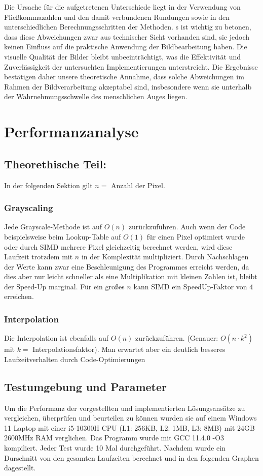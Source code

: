\documentclass[course=erap]{aspdoc}
\begin{document}
Die Ursache für die aufgetretenen Unterschiede liegt in der Verwendung von Fließkommazahlen und den damit verbundenen Rundungen sowie in den unterschiedlichen Berechnungsschritten der Methoden. s ist wichtig zu betonen, dass diese Abweichungen zwar aus technischer Sicht vorhanden sind, sie jedoch keinen Einfluss auf die praktische Anwendung der Bildbearbeitung haben. Die visuelle Qualität der Bilder bleibt unbeeinträchtigt, was die Effektivität und Zuverlässigkeit der untersuchten Implementierungen unterstreicht. Die Ergebnisse bestätigen daher unsere theoretische Annahme, dass solche Abweichungen im Rahmen der Bildverarbeitung akzeptabel sind, insbesondere wenn sie unterhalb der Wahrnehmungsschwelle des menschlichen Auges liegen.

\section{Performanzanalyse}
\subsection{Theorethische Teil:}
In der folgenden Sektion gilt $n =$ Anzahl der Pixel.

\subsubsection{Grayscaling}
Jede Grayscale-Methode ist auf $O(n)$ zurückzuführen. Auch wenn der Code beispielsweise beim Lookup-Table auf $O(1)$ für einen Pixel optimiert wurde oder durch SIMD mehrere Pixel gleichzeitig berechnet werden, wird diese Laufzeit trotzdem mit $n$ in der Komplexität multipliziert. Durch Nachschlagen der Werte kann zwar eine Beschleunigung des Programmes erreicht werden, da dies aber nur leicht schneller als eine Multiplikation mit kleinen Zahlen ist, bleibt der Speed-Up marginal. Für ein großes $n$ kann SIMD ein SpeedUp-Faktor von $4$ erreichen.

\subsubsection{Interpolation}
Die Interpolation ist ebenfalls auf $O(n)$ zurückzuführen. (Genauer: $O(n \cdot k^{2})$ mit $k =$ Interpolationsfaktor). Man erwartet aber ein deutlich besseres Laufzeitverhalten durch Code-Optimierungen

\subsection{Testumgebung und Parameter}
Um die Performanz der vorgestellten und implementierten Lösungsansätze zu vergleichen, überprüfen und beurteilen zu können wurden sie auf einem Windows 11 Laptop mit einer i5-10300H CPU (L1: 256KB, L2: 1MB, L3: 8MB) mit 24GB 2600MHz RAM verglichen. Das Programm wurde mit GCC 11.4.0 -O3 kompiliert.
Jeder Test wurde 10 Mal durchgeführt. Nachdem wurde ein Durschnitt von den gesamten Laufzeiten berechnet und in den folgenden Graphen dagestellt.
\end{document}
